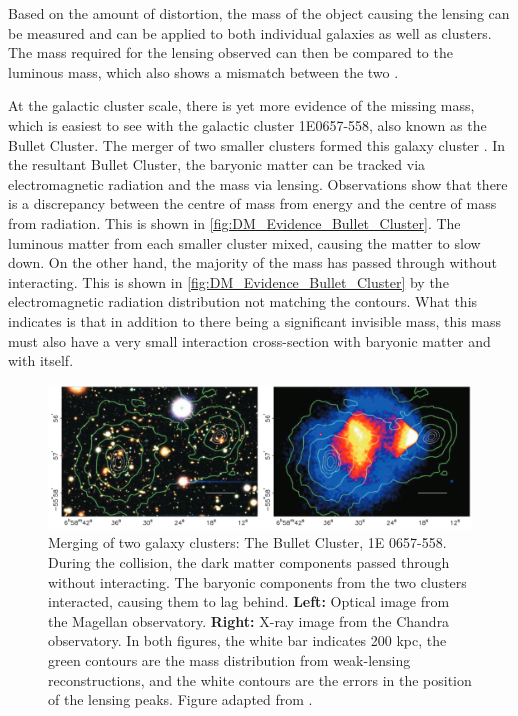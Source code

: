 \par
Based on the amount of distortion, the mass of the object causing the lensing can be measured and can be applied to both individual galaxies as well as clusters.
The mass required for the lensing observed can then be compared to the luminous mass, which also shows a mismatch between the two \cite{History_Of_Dark_Matter_2018_ref}.


\par
At the galactic cluster scale, there is yet more evidence of the missing mass, which is easiest to see with the galactic cluster 1E0657-558, also known as the Bullet Cluster.
The merger of two smaller clusters formed this galaxy cluster \cite{bullet_cluster_ref}.
In the resultant Bullet Cluster, the baryonic matter can be tracked via electromagnetic radiation and the mass via lensing.
Observations show that there is a discrepancy between the centre of mass from energy and the centre of mass from radiation.
This is shown in \autoref{fig:DM_Evidence_Bullet_Cluster}.
The luminous matter from each smaller cluster mixed, causing the matter to slow down.
On the other hand, the majority of the mass has passed through without interacting.
This is shown in \autoref{fig:DM_Evidence_Bullet_Cluster} by the electromagnetic radiation distribution not matching the contours.
What this indicates is that in addition to there being a significant invisible mass, this mass must also have a very small interaction cross-section with baryonic matter and with itself.

\begin{figure}%
    \centering
     \includegraphics[width=\textwidth]{Figures/DarkMatterEvidence/bullet_cluster_2.png}
    \caption[Merging of two galaxy cluster, 1E 0657-558]{Merging of two galaxy clusters: The Bullet Cluster, 1E 0657-558.
             During the collision, the dark matter components passed through without interacting.
             The baryonic components from the two clusters interacted, causing them to lag behind.
             \textbf{Left:} Optical image from the Magellan observatory.
             \textbf{Right:} X-ray image from the Chandra observatory.
             In both figures, the white bar indicates 200 kpc, the green contours are the mass distribution from weak-lensing reconstructions, and the white contours are the errors in the position of the lensing peaks.
             Figure adapted from \cite{bullet_cluster_ref}.}
    \label{fig:DM_Evidence_Bullet_Cluster}
\end{figure}


